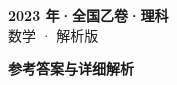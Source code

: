 \documentclass[zihao=-4, a4paper]{ctexart}
\begin{document}
\begin{center}
  {\Large\bfseries 2023 年·全国乙卷·理科}\\[4pt]
  {\large 数学 · 解析版}
\end{center}
\medskip
{}

\clearpage
{}
\begin{center}{\Large\bfseries 参考答案与详细解析}\end{center}
\medskip

\end{document}
